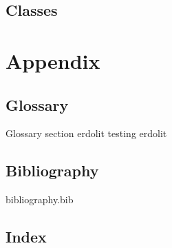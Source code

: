 \documentclass[10pt,twoside,twocolumn,openany]{book}
\begin{document}
\section{Classes}

\chapter{Appendix}
\section{Glossary}

Glossary section \Gls{erdolit} testing
\Gls{erdolit}
\printglossaries

\section{Bibliography}
\begin{refsection}{bibliography.bib}
\nocite{*}
\printbibliography
\end{refsection}

\section{Index}


\end{document}
